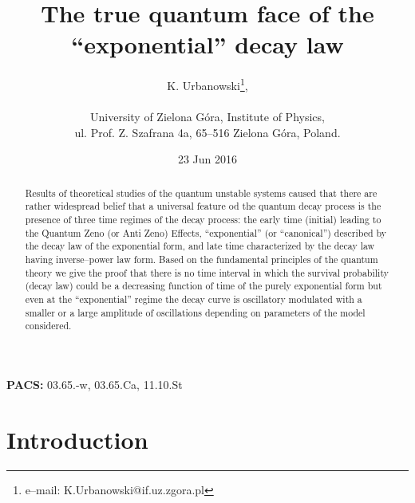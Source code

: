 \documentclass[12pt]{article}
\begin{document}
\title{The true quantum face of the ``exponential'' decay law}
\author{K. Urbanowski\footnote{e--mail:  K.Urbanowski@if.uz.zgora.pl}, \\
\hfill\\
University of Zielona G\'{o}ra, Institute of Physics, \\
ul. Prof. Z. Szafrana 4a, 65--516 Zielona G\'{o}ra, Poland.
}
\date{23 Jun 2016 }
\maketitle


\begin{abstract}
Results of theoretical studies of the quantum unstable systems caused that
there are rather widespread belief that a universal feature od the quantum decay process is the presence of three
time regimes of the decay process:
the early time (initial) leading to the Quantum Zeno (or Anti Zeno) Effects, ``exponential'' (or ``canonical'') described by the decay law of the exponential form, and late time characterized by the decay law having inverse--power law form. Based on the fundamental principles of the quantum theory
we give the proof that there is no time interval in which the survival probability (decay law) could be a decreasing function of time of the purely exponential form
but even at the ``exponential'' regime the decay curve is oscillatory modulated
with a smaller or a large amplitude of oscillations depending on parameters of the model considered.
\end{abstract}
\noindent
{\bf PACS:} 03.65.-w, 03.65.Ca, 11.10.St \\

\newpage

\section{Introduction}
\end{document}

